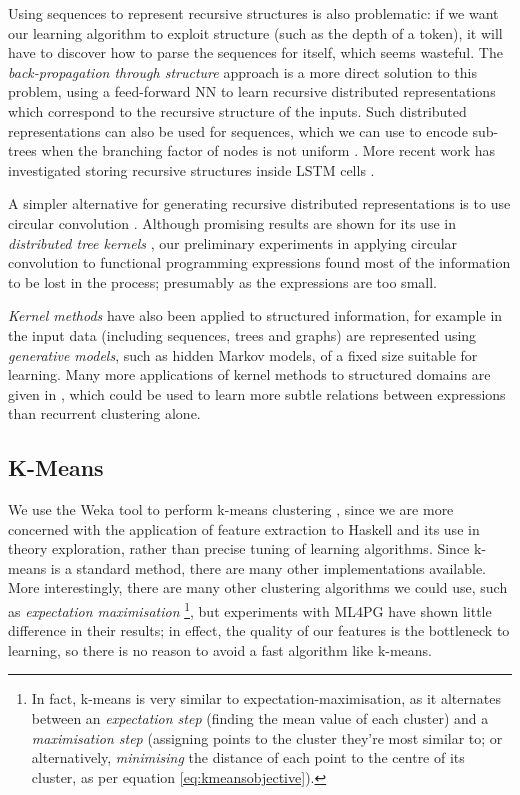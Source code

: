 Using sequences to represent recursive structures is also problematic: if we want our learning algorithm to exploit structure (such as the depth of a token), it will have to discover how to parse the sequences for itself, which seems wasteful. The \emph{back-propagation through structure} approach \citep{goller1996learning} is a more direct solution to this problem, using a feed-forward NN to learn recursive distributed representations \citep{pollack1990recursive} which correspond to the recursive structure of the inputs. Such distributed representations can also be used for sequences, which we can use to encode sub-trees when the branching factor of nodes is not  uniform \citep{kwasny1995tail}. More recent work has investigated storing recursive structures inside LSTM cells \citep{zhu2015long}.

A simpler alternative for generating recursive distributed representations is to use circular convolution \citep{conf/ijcai/Plate91}. Although promising results are shown for its use in \emph{distributed tree kernels} \citep{zanzotto2012distributed}, our preliminary experiments in applying circular convolution to functional programming expressions found most of the information to be lost in the process; presumably as the expressions are too small.

\emph{Kernel methods} have also been applied to structured information, for example in \citep{Gartner2003} the input data (including sequences, trees and graphs) are represented using \emph{generative models}, such as hidden Markov models, of a fixed size suitable for learning. Many more applications of kernel methods to structured domains are given in \citep{bakir2007predicting}, which could be used to learn more subtle relations between expressions than recurrent clustering alone.

\subsection{K-Means}

We use the Weka tool to perform k-means clustering \citep{Holmes.Donkin.Witten:1994}, since we are more concerned with the application of feature extraction to Haskell and its use in theory exploration, rather than precise tuning of learning algorithms. Since k-means is a standard method, there are many other implementations available. More interestingly, there are many other clustering algorithms we could use, such as \emph{expectation maximisation} \footnote{In fact, k-means is very similar to expectation-maximisation, as it alternates between an \emph{expectation step} (finding the mean value of each cluster) and a \emph{maximisation step} (assigning points to the cluster they're most similar to; or alternatively, \emph{minimising} the distance of each point to the centre of its cluster, as per equation \ref{eq:kmeansobjective}).}, but experiments with ML4PG have shown little difference in their results; in effect, the quality of our features is the bottleneck to learning, so there is no reason to avoid a fast algorithm like k-means.

